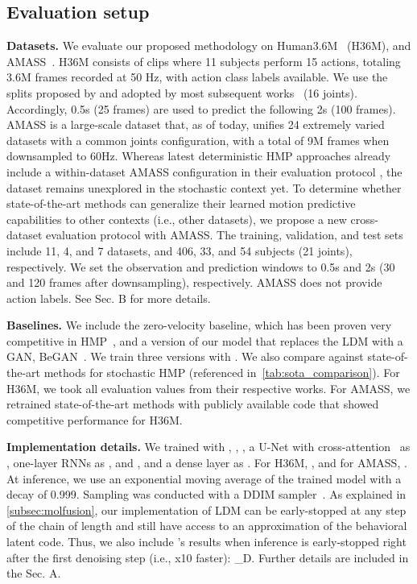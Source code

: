 \documentclass[10pt,twocolumn,letterpaper]{article}
\begin{document}
\subsection{Evaluation setup}
\label{subsec:evaluation_setup} 


\textbf{Datasets.} 
We evaluate our proposed methodology on Human3.6M~\cite{ionescu2013h36m} (H36M), and AMASS~\cite{mahmood2019amass}. 
H36M consists of clips where 11 subjects perform 15 actions, totaling 3.6M frames recorded at 50 Hz, with action class labels available. We use the splits proposed by \cite{yuan2020dlow} and adopted by most subsequent works~\cite{mao2021gsps, salzmann2022motron, ma2022multiobjective, dang2022diverse} (16 joints). Accordingly, 0.5s (25 frames) are used to predict the following 2s (100 frames). 
AMASS is a large-scale dataset that, as of today, unifies 24 extremely varied datasets with a common joints configuration, with a total of 9M frames when downsampled to 60Hz. Whereas latest deterministic HMP approaches already include a within-dataset AMASS configuration in their evaluation protocol \cite{mao2020history, aksan2021spatio, medjaouri2022hr}, the dataset remains unexplored in the stochastic context yet. 
To determine whether state-of-the-art methods can generalize their learned motion predictive capabilities to other contexts (i.e., other datasets), we propose a new cross-dataset evaluation protocol with AMASS. The training, validation, and test sets include 11, 4, and 7 datasets, and 406, 33, and 54 subjects (21 joints), respectively. We set the observation and prediction windows to 0.5s and 2s (30 and 120 frames after downsampling), respectively. AMASS does not provide action labels. See \supp{} Sec. B for more details. 


\textbf{Baselines.} We include the zero-velocity baseline, which has been proven very competitive in HMP~\cite{martinez2017human, Barquero2022}, and a version of our model that replaces the LDM with a GAN, BeGAN~\cite{gan2014}. We train three versions with .
We also compare against state-of-the-art methods for stochastic HMP (referenced in~\autoref{tab:sota_comparison}). For H36M, we took all evaluation values from their respective works. For AMASS, we retrained state-of-the-art methods with publicly available code that showed competitive performance for H36M. 

\textbf{Implementation details.} We trained \modelname{} with , , , a U-Net with cross-attention~\cite{dhariwal2021diffusionbeatsgans} as , one-layer RNNs as , and , and a dense layer as . 
For H36M, , and for AMASS, . At inference, we use an exponential moving average of the trained model with a decay of 0.999. Sampling was conducted with a DDIM sampler~\cite{song2021ddim}.
As explained in \autoref{subsec:molfusion}, our implementation of LDM can be early-stopped at any step of the chain of length  and still have access to an approximation of the behavioral latent code.
Thus, we also include \modelname{}'s results when inference is early-stopped right after the first denoising step (i.e., x10 faster): \modelname{}\_D. Further details are included in the \supp{} Sec. A.
\end{document}
